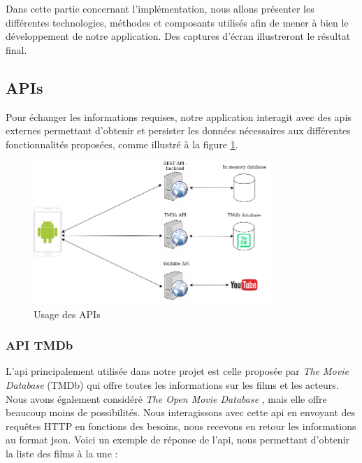 Dans cette partie concernant l'implémentation, nous allons présenter les différentes technologies, méthodes et composants utilisés afin de mener à bien le développement de notre application. Des captures d'écran illustreront le résultat final.

\subsection{APIs}
Pour échanger les informations requises, notre application interagit avec des \acrshort{api}s externes permettant d'obtenir et persister les données nécessaires aux différentes fonctionnalités proposées, comme illustré à la figure \ref{apis_usage}.
\begin{figure}
    \begin{center}
        \includegraphics[width=0.8\textwidth]{img/schemas/APIs.png}
    \end{center}
    \caption{Usage des APIs}
    \label{apis_usage}
\end{figure}

\subsubsection{API TMDb}
L'\acrshort{api} principalement utilisée dans notre projet est celle proposée par \textit{The Movie Database} (TMDb) \cite{tmdb} qui offre toutes les informations sur les films et les acteurs. Nous avons également considéré \textit{The Open Movie Database} \cite{omdb}, mais elle offre beaucoup moins de possibilités. Nous interagissons avec cette \acrshort{api} en envoyant des requêtes HTTP en fonctions des besoins, nous recevons en retour les informations au format \acrshort{json}.
Voici un exemple de réponse de l'\acrshort{api}, nous permettant d'obtenir la liste des films à la une :

